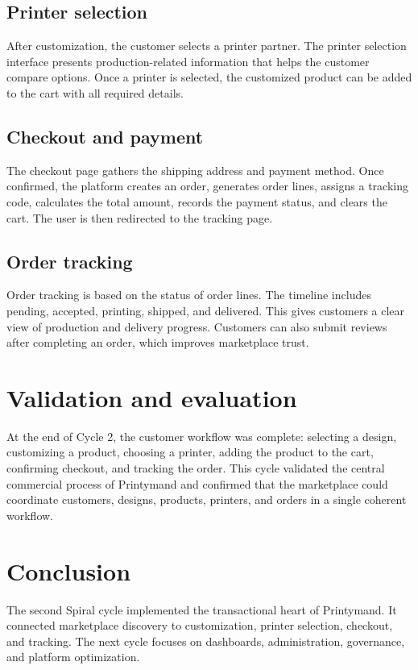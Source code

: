 \subsection{Printer selection}
After customization, the customer selects a printer partner.
The printer selection interface presents production-related information that helps the customer compare options.
Once a printer is selected, the customized product can be added to the cart with all required details.


\subsection{Checkout and payment}
The checkout page gathers the shipping address and payment method.
Once confirmed, the platform creates an order, generates order lines, assigns a tracking code, calculates the total amount, records the payment status, and clears the cart.
The user is then redirected to the tracking page.


\subsection{Order tracking}
Order tracking is based on the status of order lines.
The timeline includes pending, accepted, printing, shipped, and delivered.
This gives customers a clear view of production and delivery progress.
Customers can also submit reviews after completing an order, which improves marketplace trust.


\section{Validation and evaluation}
At the end of Cycle 2, the customer workflow was complete: selecting a design, customizing a product, choosing a printer, adding the product to the cart, confirming checkout, and tracking the order.
This cycle validated the central commercial process of Printymand and confirmed that the marketplace could coordinate customers, designs, products, printers, and orders in a single coherent workflow.

\section{Conclusion}
The second Spiral cycle implemented the transactional heart of Printymand.
It connected marketplace discovery to customization, printer selection, checkout, and tracking.
The next cycle focuses on dashboards, administration, governance, and platform optimization.
